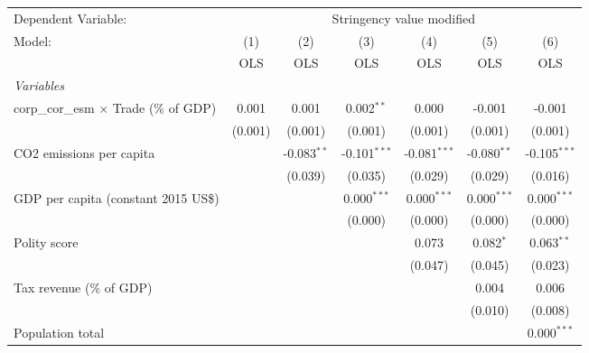 
\begingroup
\centering
\begin{tabular}{lcccccc}
   \toprule
   Dependent Variable: & \multicolumn{6}{c}{Stringency value modified}\\
   Model:                                        & (1)     & (2)           & (3)            & (4)            & (5)           & (6)\\  
                                                 &  OLS    & OLS           & OLS            & OLS            & OLS           & OLS\\  
   \midrule
   \emph{Variables}\\
   corp\_cor\_esm $\times$ Trade (\% of GDP)     & 0.001   & 0.001         & 0.002$^{**}$   & 0.000          & -0.001        & -0.001\\   
                                                 & (0.001) & (0.001)       & (0.001)        & (0.001)        & (0.001)       & (0.001)\\   
   CO2 emissions per capita                      &         & -0.083$^{**}$ & -0.101$^{***}$ & -0.081$^{***}$ & -0.080$^{**}$ & -0.105$^{***}$\\   
                                                 &         & (0.039)       & (0.035)        & (0.029)        & (0.029)       & (0.016)\\   
   GDP per capita (constant 2015 US\$)           &         &               & 0.000$^{***}$  & 0.000$^{***}$  & 0.000$^{***}$ & 0.000$^{***}$\\   
                                                 &         &               & (0.000)        & (0.000)        & (0.000)       & (0.000)\\   
   Polity score                                  &         &               &                & 0.073          & 0.082$^{*}$   & 0.063$^{**}$\\   
                                                 &         &               &                & (0.047)        & (0.045)       & (0.023)\\   
   Tax revenue (\% of GDP)                       &         &               &                &                & 0.004         & 0.006\\   
                                                 &         &               &                &                & (0.010)       & (0.008)\\   
   Population total                              &         &               &                &                &               & 0.000$^{***}$\\   

\end{tabular}
